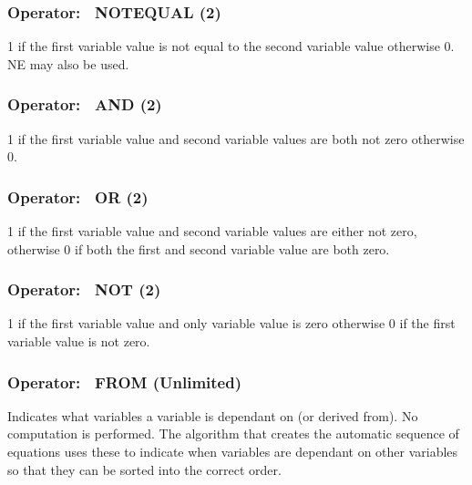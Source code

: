 \subsubsection{Operator:~ NOTEQUAL (2)}\label{operator-notequal-2}

1 if the first variable value is not equal to the second variable value otherwise 0. NE may also be used.

\subsubsection{Operator:~ AND (2)}\label{operator-and-2}

1 if the first variable value and second variable values are both not zero otherwise 0.

\subsubsection{Operator:~ OR (2)}\label{operator-or-2}

1 if the first variable value and second variable values are either not zero, otherwise 0 if both the first and second variable value are both zero.

\subsubsection{Operator:~ NOT (2)}\label{operator-not-2}

1 if the first variable value and only variable value is zero otherwise 0 if the first variable value is not zero.

\subsubsection{Operator:~ FROM (Unlimited)}\label{operator-from-unlimited}

Indicates what variables a variable is dependant on (or derived from). No computation is performed. The algorithm that creates the automatic sequence of equations uses these to indicate when variables are dependant on other variables so that they can be sorted into the correct order.